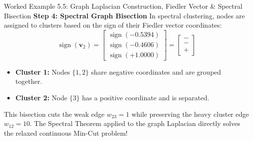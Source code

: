 \begin{examplebox}{Worked Example 5.5: Graph Laplacian Construction, Fiedler Vector \& Spectral Bisection}
\textbf{Step 4: Spectral Graph Bisection}
In spectral clustering, nodes are assigned to clusters based on the sign of their Fiedler vector coordinates:
\begin{equation*}
\operatorname{sign}(\mathbf{v}_2) = \begin{bmatrix} \operatorname{sign}(-0.5394) \\ \operatorname{sign}(-0.4606) \\ \operatorname{sign}(+1.0000) \end{bmatrix} = \begin{bmatrix} - \\ - \\ + \end{bmatrix}
\end{equation*}
\begin{itemize}
    \item \textbf{Cluster 1:} Nodes $\{1, 2\}$ share negative coordinates and are grouped together.
    \item \textbf{Cluster 2:} Node $\{3\}$ has a positive coordinate and is separated.
\end{itemize}
This bisection cuts the weak edge $w_{23} = 1$ while preserving the heavy cluster edge $w_{12} = 10$. The Spectral Theorem applied to the graph Laplacian directly solves the relaxed continuous Min-Cut problem!
\end{examplebox}



